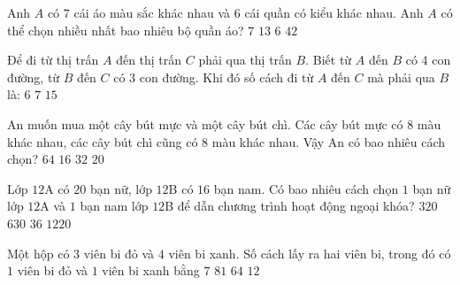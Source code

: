 \begin{ex}%
	Anh $A$ có $7$ cái áo màu sắc khác nhau và $6$ cái quần có kiểu khác nhau. Anh $A$ có thể chọn nhiều nhất bao nhiêu bộ quần áo?
	\choice
	{$7$}
	{$13$}
	{$6$}
	{\True $42$}
\end{ex}

\begin{ex}%
	Để đi từ thị trấn $A$ đến thị trấn $C$ phải qua thị trấn $B$. Biết từ $A$ đến $B$ có 4 con đường, từ $B$ đến $C$ có 3 con đường. Khi đó số cách đi từ $A$ đến $C$ mà phải qua $B$ là:
	\choice
	{$6$}
	{$7$}
	{$15$}
	{}
\end{ex}

\begin{ex}%
	An muốn mua một cây bút mực và một cây bút chì. Các cây bút mực có $8$ màu khác nhau, các cây bút chì cũng có $8$ màu khác nhau. Vậy An có bao nhiêu cách chọn?
	\choice
	{\True $64$}
	{$16$}
	{$32$}
	{$20$}
\end{ex}

\begin{ex}%
	Lớp $12$A có $20$ bạn nữ, lớp $12$B có $16$ bạn nam. Có bao nhiêu cách chọn $1$ bạn nữ lớp $12$A và $1$ bạn nam lớp $12$B để dẫn chương trình hoạt động ngoại khóa?
	\choice
	{\True $320$}
	{$630$}
	{$36$}
	{$1220$}
\end{ex}

\begin{ex}%
	Một hộp có $3$ viên bi đỏ và $4$ viên bi xanh. Số cách lấy ra hai viên bi, trong đó có $1$ viên bi đỏ và $1$ viên bi xanh bằng
	\choice
	{$7$}
	{$81$}
	{$64$}
	{\True $12$}
\end{ex}

